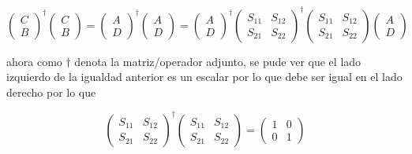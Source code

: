 \documentclass[12pt,a4paper]{article}
\begin{document}
\begin{enumerate}
    \begin{equation*}
        \left(\begin{matrix}
         C \\
         B
        \end{matrix}\right)^{\dagger}\left(\begin{matrix}
         C \\
         B
        \end{matrix}\right) = \left(\begin{matrix}
         A \\
         D
        \end{matrix}\right)^{\dagger}
        \left(\begin{matrix}
         A \\
         D
        \end{matrix}\right) = 
        \left(\begin{matrix}
         A \\
         D
        \end{matrix}\right)^{\dagger}
        \left(\begin{matrix}
         S_{11} & S_{12} \\
         S_{21} & S_{22}
        \end{matrix}\right)^{\dagger} \left(\begin{matrix}
         S_{11} & S_{12} \\
         S_{21} & S_{22}
        \end{matrix}\right)
        \left(\begin{matrix}
         A \\
         D
        \end{matrix}\right)
    \end{equation*}
    
    
    
    ahora como $\dagger$ denota la matriz/operador adjunto, se pude ver que el lado izquierdo de la igualdad anterior es un escalar por lo que debe ser igual en el lado derecho por lo que
    
    \begin{equation*}
        \left(\begin{matrix}
         S_{11} & S_{12} \\
         S_{21} & S_{22}
        \end{matrix}\right)^{\dagger} \left(\begin{matrix}
         S_{11} & S_{12} \\
         S_{21} & S_{22}
        \end{matrix}\right) =
        \left(\begin{matrix}
         1 & 0 \\
         0 & 1
        \end{matrix}\right)
    \end{equation*}
    

\end{enumerate}
\end{document}
